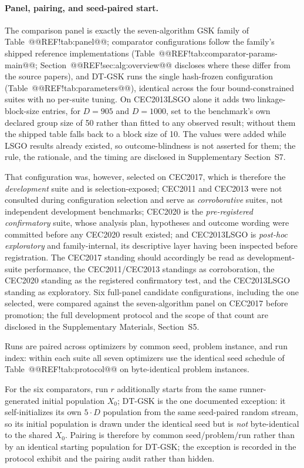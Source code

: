 \documentclass[10pt,a4paper]{article}
\newcommand{\dtgsk}{DT-GSK}
\begin{document}
\paragraph{Panel, pairing, and seed-paired start.}
The comparison panel is exactly the seven-algorithm GSK family of
Table~@@REF!tab:panel@@; comparator configurations follow the family's
shipped reference implementations
(Table~@@REF!tab:comparator-params-main@@;
Section~@@REF!sec:alg:overview@@ discloses where these differ from the
source papers), and \dtgsk{} runs the single hash-frozen configuration
(Table~@@REF!tab:parameters@@), identical across the four bound-constrained
suites with no per-suite tuning. On CEC2013LSGO alone it adds two
linkage-block-size entries, for $D = 905$ and $D = 1000$, set to the
benchmark's own declared group size of 50 rather than fitted to any
observed result; without them the shipped table falls back to a block
size of 10. The values were added while LSGO results already existed, so
outcome-blindness is not asserted for them; the rule, the rationale, and
the timing are disclosed in Supplementary Section~S7.

That configuration was, however,
selected on CEC2017, which is therefore the \emph{development} suite and is
selection-exposed; CEC2011 and CEC2013 were not consulted during
configuration selection and serve as \emph{corroborative} suites, not
independent development benchmarks; CEC2020 is the \emph{pre-registered
confirmatory} suite, whose analysis plan, hypotheses and outcome wording
were committed before any CEC2020 result existed; and CEC2013LSGO is
\emph{post-hoc exploratory} and family-internal, its descriptive layer
having been inspected before registration. The CEC2017 standing should
accordingly be
read as development-suite performance, the CEC2011/CEC2013 standings as
corroboration, the CEC2020 standing as the registered confirmatory test,
and the CEC2013LSGO standing as exploratory. Six full-panel candidate
configurations, including the one
selected, were compared against the seven-algorithm panel on CEC2017 before
promotion; the full development protocol and the scope of that count are
disclosed in the Supplementary Materials, Section~S5.

Runs are paired across optimizers by common seed, problem instance, and
run index: within each suite all seven optimizers use the identical seed
schedule of Table~@@REF!tab:protocol@@ on byte-identical problem instances.

For the six comparators, run $r$ additionally starts from the same
runner-generated initial population $X_{0}$; \dtgsk{} is the one
documented exception: it self-initializes its own $5 \cdot D$ population
from the same seed-paired random stream, so its initial population is drawn
under the identical seed but is \emph{not} byte-identical to the shared
$X_{0}$. Pairing is therefore by common seed/problem/run rather than by an
identical starting population for \dtgsk{}; the exception is recorded in
the protocol exhibit and the pairing audit rather than hidden.
\end{document}
